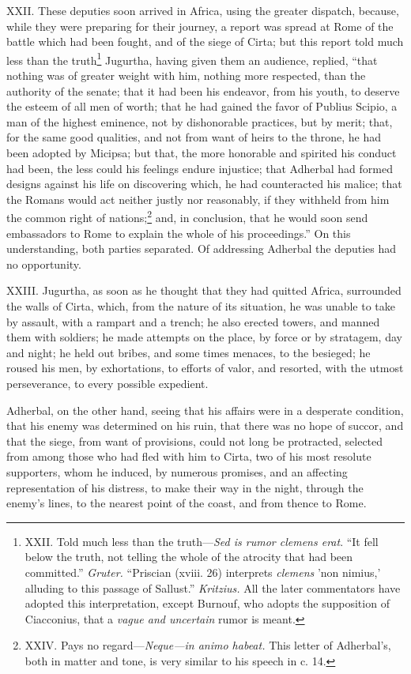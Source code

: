 XXII. These deputies soon arrived in Africa, using the greater
dispatch, because, while they were preparing for their journey, a
report was spread at Rome of the battle which had been fought, and of
the siege of Cirta; but this report told much less than the truth\footnote{XXII. Told much less than the truth—\emph{Sed is rumor clemens erat}.
``It fell below the truth, not telling the whole of the atrocity that
had been committed.'' \emph{Gruter.} ``Priscian (xviii. 26) interprets
\emph{clemens} 'non nimius,' alluding to this passage of Sallust.''
\emph{Kritzius.} All the later commentators have adopted this interpretation,
except Burnouf, who adopts the supposition of Ciacconius, that a \emph{vague
and uncertain} rumor is meant.}
Jugurtha, having given them an audience, replied, ``that nothing was of
greater weight with him, nothing more respected, than the authority of
the senate; that it had been his endeavor, from his youth, to deserve
the esteem of all men of worth; that he had gained the favor of
Publius Scipio, a man of the highest eminence, not by dishonorable
practices, but by merit; that, for the same good qualities, and not
from want of heirs to the throne, he had been adopted by Micipsa; but
that, the more honorable and spirited his conduct had been, the less
could his feelings endure injustice; that Adherbal had formed designs
against his life on discovering which, he had counteracted his malice;
that the Romans would act neither justly nor reasonably, if they
withheld from him the common right of nations;\footnote{XXIV. Pays no regard—\emph{Neque—in animo habeat.} This letter of
Adherbal's, both in matter and tone, is very similar to his speech
in c. 14.} and, in conclusion,
that he would soon send embassadors to Rome to explain the whole of
his proceedings.'' On this understanding, both parties separated. Of
addressing Adherbal the deputies had no opportunity.

XXIII. Jugurtha, as soon as he thought that they had quitted Africa,
surrounded the walls of Cirta, which, from the nature of its
situation, he was unable to take by assault, with a rampart and a
trench; he also erected towers, and manned them with soldiers; he made
attempts on the place, by force or by stratagem, day and night; he
held out bribes, and some times menaces, to the besieged; he roused
his men, by exhortations, to efforts of valor, and resorted, with the
utmost perseverance, to every possible expedient.

Adherbal, on the other hand, seeing that his affairs were in a
desperate condition, that his enemy was determined on his ruin, that
there was no hope of succor, and that the siege, from want of
provisions, could not long be protracted, selected from among those
who had fled with him to Cirta, two of his most resolute supporters,
whom he induced, by numerous promises, and an affecting representation
of his distress, to make their way in the night, through the enemy's
lines, to the nearest point of the coast, and from thence to Rome.

